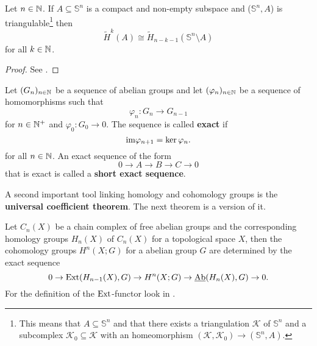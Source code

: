 \begin{thm}\label{thm:alex}
  Let $n \in \mathbb{N}$. If $A \subseteq \mathbb{S}^n$ is a compact and non-empty subspace and ($\mathbb{S}^n, A$) is triangulable\footnote{This means that $A \subseteq \mathbb{S}^n$ and that there exists a triangulation $\mathcal{K}$ of $\mathbb{S}^n$ and a subcomplex $\mathcal{K}_0 \subseteq \mathcal{K}$ with an homeomorphism $(\mathcal{K}, \mathcal{K}_0) \to (\mathbb{S}^n, A)$.} then
  \begin{equation*}
    \tilde{H}^k(A) \cong \tilde{H}_{n-k-1}(\mathbb{S}^n \setminus A)
  \end{equation*}
  for all $k \in \mathbb{N}$.
\end{thm}

\begin{proof}
  See \cite[Theorem 71.1]{MunAlTop}.
\end{proof}

\begin{defin}
  Let $(G_n)_{n\in\mathbb{N}}$ be a sequence of abelian groups and let $(\varphi_n)_{n\in\mathbb{N}}$ be a sequence of homomorphisms such that
  \begin{equation*}
    \varphi_n\colon G_n \to G_{n-1}
  \end{equation*}
  for $n \in \mathbb{N}^+$ and $\varphi_0\colon G_0 \to 0$.
  The sequence is called \textbf{exact} if
  \begin{equation*}
    {\rm im}\varphi_{n+1} = \ker\varphi_n.
  \end{equation*}
  for all $n \in \mathbb{N}$.
  An exact sequence of the form
  \begin{equation*}
    0 \to A \to B \to C \to 0
  \end{equation*}
  that is exact is called a \textbf{short exact sequence}.
\end{defin}

A second important tool linking homology and cohomology groups is the \textbf{universal coefficient theorem}. The next theorem is a version of it.

\begin{thm}\label{thm:uct}
Let $C_n(X)$ be a chain complex of free abelian groups and the corresponding homology groups $H_n(X)$ of $C_n(X)$ for a topological space $X$, then the cohomology groups $H^n(X; G)$ for a abelian group $G$ are determined by the exact sequence
  \begin{equation*}
    0 \to {\rm Ext}(H_{n-1}(X), G) \to H^n(X; G) \to \underline{\rm Ab}(H_n(X), G) \to 0.
  \end{equation*}
  For the definition of the ${\rm Ext}$-functor look in \cite[p. 195]{hatcher}.
\end{thm}

